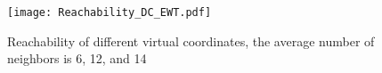 \begin{figure}[ht]
	\centering
    \texttt{[image: Reachability\_DC\_EWT.pdf]}
    \caption{Reachability of different virtual coordinates, the average number of neighbors is 6, 12, and 14} 			\label{fig:reachability}
\end{figure}


